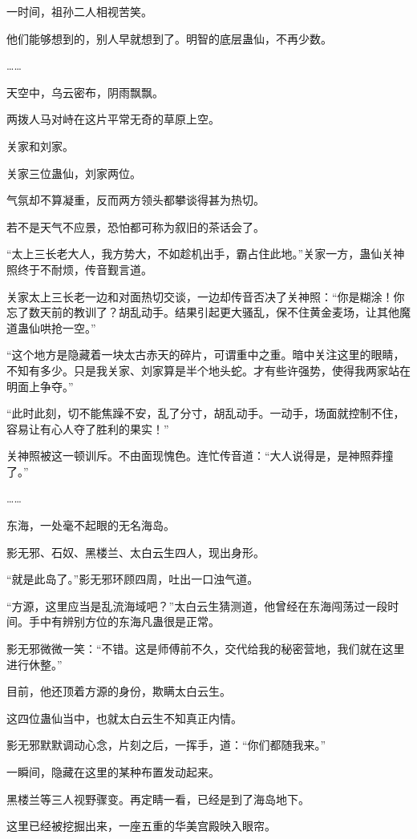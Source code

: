 \begin{this_body}
一时间，祖孙二人相视苦笑。

他们能够想到的，别人早就想到了。明智的底层蛊仙，不再少数。

……

天空中，乌云密布，阴雨飘飘。

两拨人马对峙在这片平常无奇的草原上空。

关家和刘家。

关家三位蛊仙，刘家两位。

气氛却不算凝重，反而两方领头都攀谈得甚为热切。

若不是天气不应景，恐怕都可称为叙旧的茶话会了。

“太上三长老大人，我方势大，不如趁机出手，霸占住此地。”关家一方，蛊仙关神照终于不耐烦，传音觐言道。

关家太上三长老一边和对面热切交谈，一边却传音否决了关神照：“你是糊涂！你忘了数天前的教训了？胡乱动手。结果引起更大骚乱，保不住黄金麦场，让其他魔道蛊仙哄抢一空。”

“这个地方是隐藏着一块太古赤天的碎片，可谓重中之重。暗中关注这里的眼睛，不知有多少。只是我关家、刘家算是半个地头蛇。才有些许强势，使得我两家站在明面上争夺。”

“此时此刻，切不能焦躁不安，乱了分寸，胡乱动手。一动手，场面就控制不住，容易让有心人夺了胜利的果实！”

关神照被这一顿训斥。不由面现愧色。连忙传音道：“大人说得是，是神照莽撞了。”

……

东海，一处毫不起眼的无名海岛。

影无邪、石奴、黑楼兰、太白云生四人，现出身形。

“就是此岛了。”影无邪环顾四周，吐出一口浊气道。

“方源，这里应当是乱流海域吧？”太白云生猜测道，他曾经在东海闯荡过一段时间。手中有辨别方位的东海凡蛊很是正常。

影无邪微微一笑：“不错。这是师傅前不久，交代给我的秘密营地，我们就在这里进行休整。”

目前，他还顶着方源的身份，欺瞒太白云生。

这四位蛊仙当中，也就太白云生不知真正内情。

影无邪默默调动心念，片刻之后，一挥手，道：“你们都随我来。”

一瞬间，隐藏在这里的某种布置发动起来。

黑楼兰等三人视野骤变。再定睛一看，已经是到了海岛地下。

这里已经被挖掘出来，一座五重的华美宫殿映入眼帘。


\end{this_body}
